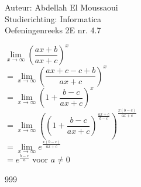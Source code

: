 \documentclass[a4paper]{article}
\begin{document}
  
\noindent \large Auteur: Abdellah El Moussaoui \\
\noindent \large Studierichting: Informatica\\
\noindent \large Oefeningenreeks 2E nr. 4.7\\

\medskip

\normalsize


$\lim\limits_{x\to\infty} \left(\dfrac{ax+b}{ax+c}\right)^x$\\


$ = \lim\limits_{x\to\infty} \left(\dfrac{ax+c-c+b}{ax+c}\right)^x$\\


$ = \lim\limits_{x\to\infty} \left(1+\dfrac{b-c}{ax+c}\right)^x$\\

$ = \lim\limits_{x\to\infty} \left(\left(1+\dfrac{b-c}{ax+c}\right)^{\tfrac{ax+c}{b-c}}\right)^{\tfrac{x\left(b-c\right)}{ax+c}}$\\


$ = \lim\limits_{x\to\infty} e^{\tfrac{x\left(b-c\right)}{ax+c}}$\\


$ = e^{\tfrac{b-c}{a}}$ voor $a\neq0$\\


\begin{thebibliography}{999}
\end{thebibliography}
\end{document}
